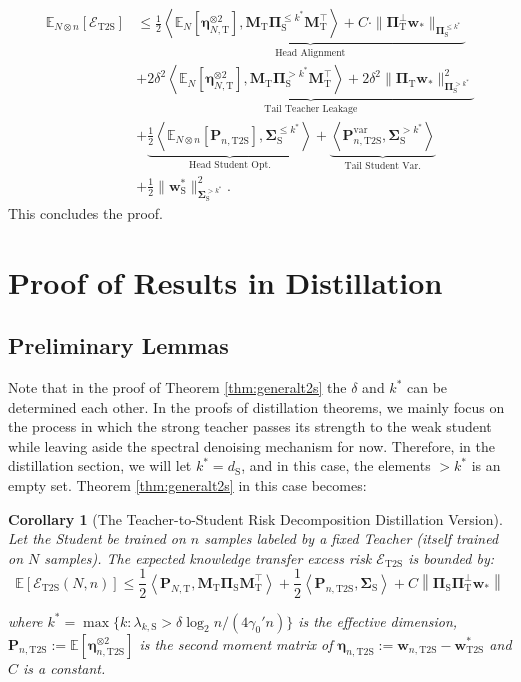 \documentclass{article}
\theoremstyle{definition}
\theoremstyle{definition}
\theoremstyle{plain}
\theoremstyle{plain}
\theoremstyle{plain}
\theoremstyle{plain}
\newtheorem{corollary}{Corollary}
\theoremstyle{plain}
\newcommand{\bs}[1]{\boldsymbol{\mathbf{#1}}}
\newcommand{\Ex}{\mathbb{E}}
\newcommand{\te}{\mathrm{T}}
\newcommand{\st}{\mathrm{S}}
\newcommand{\ts}{\mathrm{T2S}}
\newcommand{\M}{\mathbf{M}}
\newcommand{\Sig}{\mathbf{\Sigma}}
\newcommand{\w}{\mathbf{w}}
\newcommand{\ex}[2][]{\mathbb{E}_{#1}\left[ #2 \right]}
\newcommand{\inner}[1]{\left\langle#1\right\rangle}
\begin{document}
\begin{equation}
\begin{aligned}
    \ex[N\otimes n]{\mathcal{E}_{\mathrm{T2S}}} &\leq 
    \underbrace{\frac{1}{2}\inner{\ex[N]{\bs\eta_{N,\te}^{\otimes 2}},\M_\te\bs \Pi_{\st}^{\leq k^*}\M_\te^\top} + C\cdot\|\bs \Pi_{\te}^{\perp}\w_*\|_{\bs \Pi_{\st}^{\leq k^*}}}_{\text{Head Alignment}} \\
    &+ \underbrace{2\delta^2\inner{\ex[N]{\bs\eta_{N,\te}^{\otimes 2}},\M_\te\bs \Pi_{\st}^{> k^*}\M_\te^\top} + 2\delta^2\|\bs \Pi_\te \w_*\|_{\bs \Pi_\st^{> k^*}}^2}_{\text{Tail Teacher Leakage}} \\
    &+ \underbrace{\frac{1}{2}\inner{\ex[N\otimes n]{\bs P_{n,\ts}},\Sig_{\st}^{\leq k^*}}}_{\text{Head Student Opt.}} 
    + \underbrace{\inner{\bs P^{\mathrm{var}}_{n,\ts},\Sig_\st^{> k^*}}}_{\text{Tail Student Var.}} \\
    &+ \frac{1}{2}\|\w^*_\st\|_{\Sig_\st^{> k^*}}^2.
\end{aligned}
\end{equation}
This concludes the proof.


\section{Proof of Results in Distillation}


\subsection{Preliminary Lemmas}

Note that in the proof of Theorem \ref{thm:generalt2s} the $\delta$ and $k^*$ can be determined each other. In the proofs of distillation theorems, we mainly focus on the process in which the strong teacher passes its strength to the weak student while leaving aside the spectral denoising mechanism for now. Therefore, in the distillation section, we will let $k^* = d_\st$, and in this case, the elements $>k^*$ is an empty set. Theorem \ref{thm:generalt2s} in this case becomes:

\begin{corollary}[The Teacher-to-Student Risk Decomposition Distillation Version]
\label{crl:kddecomp}
    Let the Student be trained on $n$ samples labeled by a fixed Teacher (itself trained on $N$ samples). The expected knowledge transfer excess risk $\mathcal{E}_{\mathrm{T2S}}$ is bounded by:
    \begin{equation}
        \Ex[\mathcal{E}_{\mathrm{T2S}}(N,n)] \leq \frac{1}{2}\inner{\bs P_{N,\te},\M_\te\bs \Pi_{\st}\M_\te^\top} + \frac{1}{2}\inner{\bs P_{n,\ts},\Sig_{\st}} + C\left\|\bs \Pi_{\st}\bs \Pi_{\te}^{\perp}\w_{*}\right\|
    \end{equation}
    
    \noindent where $k^* = \max\{k:\lambda_{k,\st}> \delta\log_2 n/ (4\gamma_0' n) \}$ is the effective dimension, $\bs P_{n,\ts}:=\Ex[\bs\eta_{n,\ts}^{\otimes2}]$ is the second moment matrix of $\bs\eta_{n,\ts}:=\w_{n,\ts}-\w^*_{\ts}$ and $C$ is a constant.
\end{corollary}
\end{document}
